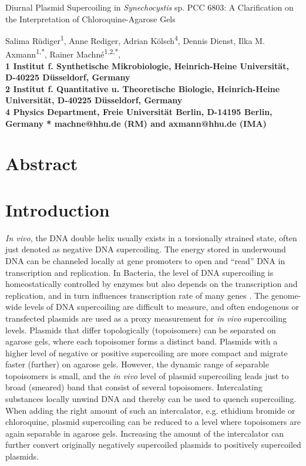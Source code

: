 \documentclass[10pt,letterpaper]{article}
\begin{document}
\vspace*{0.35in}

\begin{flushleft}
{\Large Diurnal Plasmid Supercoiling in \textit{Synechocystis} sp. PCC 6803: A Clarification on the Interpretation of Chloroquine-Agarose Gels}

Salima R\"udiger\textsuperscript{1}, 
Anne Rediger, Adrian K\"olsch\textsuperscript{4}, Dennis Dienst,
Ilka M. Axmann\textsuperscript{1,*},
Rainer Machn\'e\textsuperscript{1,2,*},
\\
\bigskip
\bf{1} Institut f. Synthetische Mikrobiologie, Heinrich-Heine Universit\"at, D-40225 D\"usseldorf, Germany
\\
\bf{2} Institut f. Quantitative u. Theoretische Biologie, Heinrich-Heine Universit\"at, D-40225 D\"usseldorf, Germany
\\
\bf{4} Physics Department, Freie Universität Berlin, D-14195 Berlin, Germany
\bigskip
* machne@hhu.de (RM) and axmann@hhu.de (IMA)

\end{flushleft}

\section*{Abstract}


\linenumbers


\section{Introduction}
\textit{In vivo}, the DNA double helix usually exists in a torsionally
strained state, often just denoted as negative DNA supercoiling.  The
energy stored in underwound DNA can be channeled locally at gene
promoters to open and ``read'' DNA in transcription and replication.
In Bacteria, the level of DNA supercoiling is homeostatically controlled by
enzymes but also depends on the transcription and replication, and
in turn influences transcription rate of many genes \cite{Dorman2019}. 
%
The genome-wide levels of DNA supercoiling are difficult to measure,
and often endogenous or transfected plasmids are used as a proxy
measurement for \textit{in vivo} supercoiling levels. Plasmids that
differ topologically (topoisomers) can be separated on agarose gels,
where each topoisomer forms a distinct band. Plasmids with a higher
level of negative or positive supercoiling are more compact and
migrate faster (further) on agarose gels. However, the dynamic range
of separable topoisomers is small, and the \textit{in vivo} level of
plasmid supercoiling leads just to broad (smeared) band that consist
of several topoisomers. Intercalating substances locally unwind DNA
and thereby can be used to quench supercoiling.  When adding the right
amount of such an intercalator, e.g. ethidium bromide or chloroquine,
plasmid supercoiling can be reduced to a level where topoisomers are
again separable in agarose gels. Increasing the amount of the intercalator
can further convert originally negatively supercoiled plasmids to
positively supercoiled plasmids.
\end{document}
